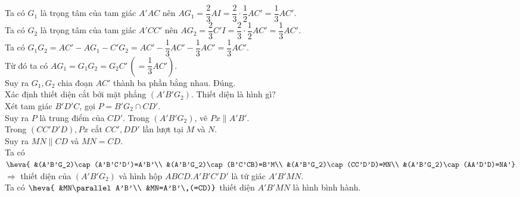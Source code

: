 \begin{ex}
{\begin{itemchoice}
{
			 }\\
			Ta có $G_1$  là trọng tâm của tam giác $A'AC$ nên $AG_1=\dfrac{2}{3}AI =\dfrac{2}{3}\cdot \dfrac{1}{2}AC'=\dfrac{1}{3}AC'$.\\
			Ta có $G_2$ là trọng tâm của tam giác  $A'CC'$ nên $AG_2 =\dfrac{2}{3}C'I =\dfrac{2}{3}\cdot \dfrac{1}{2}AC' =\dfrac{1}{3}AC'$.\\
			Ta có $G_1G_2  =AC'-AG_1-C'G_2 =AC'-\dfrac{1}{3}AC'-\dfrac{1}{3}AC' =\dfrac{1}{3}AC'$.\\
			Từ đó ta  có $AG_1=G_1G_2 =G_2C'\, (=\dfrac{1}{3}AC')$.\\
			Suy ra $G_1, G_2$ chia đoạn  $AC'$ thành ba phần bằng nhau.
			\itemch Đúng.\\ 
			Xác định thiết diện cắt bởi mặt phẳng $(A'B'G_2)$. Thiết diện là hình gì?\\ 
			Xét tam giác $B'D'C$, gọi $P=B'G_2\cap CD'$.\\ 
			Suy ra  $P$ là trung điểm của $CD'$.
			Trong $(A'B'G_2)$, vẽ $Px\parallel  A'B'$.\\
			Trong $(CC'D'D), Px$  cắt $CC', DD'$ lần lượt tại $M$ và $N$.\\
			Suy ra $MN\parallel CD$  và $MN=CD$.\\
			Ta có  $\heva{
			&(A'B'G_2)\cap  (A'B'C'D')=A'B'\\
			&(A'B'G_2)\cap  (B'C'CB)=B'M\\
			 &(A'B'G_2)\cap (CC'D'D)=MN\\
			&(A'B'G_2)\cap (AA'D'D)=NA'} $\\ 
			$\Rightarrow $ thiết diện  của $(A'B'G_2)$ và hình hộp $ABCD.A'B'C'D'$ là tứ giác $A'B'MN$.\\
			Ta  có $\heva{
			&MN\parallel  A'B'\\
			&MN=A'B'\,(=CD)} $ thiết diện  $A'B'MN$ là hình bình hành.
		\end{itemchoice}
	} 
\end{ex}

